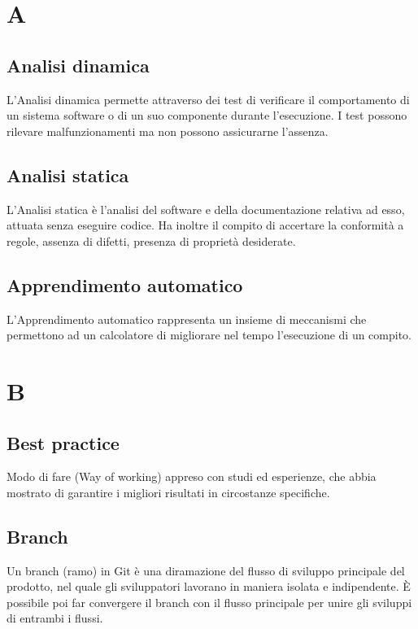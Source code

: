 {	\section{A}
	\subsection{Analisi dinamica} 
	L'Analisi dinamica permette attraverso dei test di verificare il comportamento di un sistema software o di un suo componente durante l'esecuzione. I test possono rilevare malfunzionamenti ma non possono assicurarne l'assenza.
	
	\subsection{Analisi statica}
	L'Analisi statica è l'analisi del software e della documentazione relativa ad esso, attuata senza eseguire codice. Ha inoltre il compito di accertare la conformità a regole, assenza di difetti, presenza di proprietà desiderate.
	
	\subsection{Apprendimento automatico}
	L'Apprendimento automatico rappresenta un insieme di meccanismi che permettono ad un calcolatore di migliorare nel tempo l'esecuzione di un compito. 
	
	\section{B}
	\subsection{Best practice} 
	Modo di fare (Way of working) appreso con studi ed esperienze, che abbia mostrato di garantire i migliori risultati in circostanze specifiche.
	
	\subsection{Branch} 
	Un branch (ramo) in Git è una diramazione del flusso di sviluppo principale del prodotto, nel quale gli sviluppatori lavorano in maniera isolata e indipendente. \`E possibile poi far convergere il branch con il flusso principale per unire gli sviluppi di entrambi i flussi.
	
}
